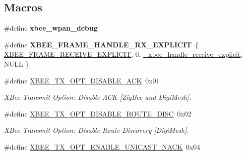 \subsection*{Macros}
\begin{DoxyCompactItemize}
\item 
\mbox{\label{group__xbee__wpan_gaca7a1f4a9ddf33e00ce7fd9382e18d29}} 
\#define {\bfseries xbee\+\_\+wpan\+\_\+debug}
\item 
\mbox{\label{group__xbee__wpan_ga8ac9b01d771126ea2e391a12a0a996ee}} 
\#define {\bfseries X\+B\+E\+E\+\_\+\+F\+R\+A\+M\+E\+\_\+\+H\+A\+N\+D\+L\+E\+\_\+\+R\+X\+\_\+\+E\+X\+P\+L\+I\+C\+IT}~\{ \hyperlink{group__xbee__device_gga7753bbebaf00d6d64942f64b6ae9b7b9a8f80b5fa338b8bf34888ffcbfd260a54}{X\+B\+E\+E\+\_\+\+F\+R\+A\+M\+E\+\_\+\+R\+E\+C\+E\+I\+V\+E\+\_\+\+E\+X\+P\+L\+I\+C\+IT}, 0, \hyperlink{group__xbee__wpan_ga8cb1973677412a2c5627a77009a8f283}{\+\_\+xbee\+\_\+handle\+\_\+receive\+\_\+explicit}, N\+U\+LL \}
\item 
\mbox{\label{group__xbee__wpan_ga4f363736032969f338cfd4e335e9be50}} 
\#define \hyperlink{group__xbee__wpan_ga4f363736032969f338cfd4e335e9be50}{X\+B\+E\+E\+\_\+\+T\+X\+\_\+\+O\+P\+T\+\_\+\+D\+I\+S\+A\+B\+L\+E\+\_\+\+A\+CK}~0x01
\begin{DoxyCompactList}\small\item\em X\+Bee Transmit Option\+: Disable A\+CK \mbox{[}Zig\+Bee and Digi\+Mesh\mbox{]}. \end{DoxyCompactList}\item 
\mbox{\label{group__xbee__wpan_ga6a2846b0ca6b15ad7bdd7e4503fe5c30}} 
\#define \hyperlink{group__xbee__wpan_ga6a2846b0ca6b15ad7bdd7e4503fe5c30}{X\+B\+E\+E\+\_\+\+T\+X\+\_\+\+O\+P\+T\+\_\+\+D\+I\+S\+A\+B\+L\+E\+\_\+\+R\+O\+U\+T\+E\+\_\+\+D\+I\+SC}~0x02
\begin{DoxyCompactList}\small\item\em X\+Bee Transmit Option\+: Disable Route Discovery \mbox{[}Digi\+Mesh\mbox{]}. \end{DoxyCompactList}\item 
\mbox{\label{group__xbee__wpan_ga8e8ed1a92da23af9d12c15a72a37795c}} 
\#define \hyperlink{group__xbee__wpan_ga8e8ed1a92da23af9d12c15a72a37795c}{X\+B\+E\+E\+\_\+\+T\+X\+\_\+\+O\+P\+T\+\_\+\+E\+N\+A\+B\+L\+E\+\_\+\+U\+N\+I\+C\+A\+S\+T\+\_\+\+N\+A\+CK}~0x04

\end{DoxyCompactItemize}
